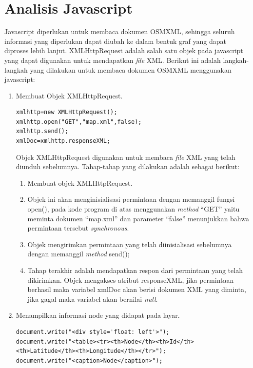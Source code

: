 \section{Analisis Javascript} \label{ssec:analisis_js}
Javascript diperlukan untuk membaca dokumen OSMXML, sehingga seluruh informasi
yang diperlukan dapat diubah ke dalam bentuk graf yang dapat diproses lebih
lanjut. XMLHttpRequest adalah salah satu objek pada javascript yang dapat
digunakan untuk mendapatkan \textit{file} XML. Berikut ini adalah langkah-langkah yang
dilakukan untuk membaca dokumen OSMXML menggunakan javascript:
\begin{enumerate}
  \item Membuat Objek XMLHttpRequest. 
\begin{verbatim}
xmlhttp=new XMLHttpRequest();
xmlhttp.open("GET","map.xml",false);
xmlhttp.send();
xmlDoc=xmlhttp.responseXML;
\end{verbatim}
Objek XMLHttpRequest digunakan untuk membaca \textit{file} XML yang telah
diunduh sebelumnya. Tahap-tahap yang dilakukan adalah sebagai berikut:
\begin{enumerate}
  \item Membuat objek XMLHttpRequest.
  
  \item Objek ini akan menginisialisasi permintaan dengan memanggil fungsi
  open(), pada kode program di atas menggunakan \textit{method} ``GET'' yaitu meminta dokumen ``map.xml'' 
  dan parameter ``false'' menunjukkan bahwa permintaan tersebut \textit{synchronous}.
  
  \item Objek mengirimkan permintaan yang telah diinisialisasi sebelumnya dengan
  memanggil \textit{method} send();
  
  \item Tahap terakhir adalah mendapatkan respon dari permintaan yang telah
  dikirimkan. Objek mengakses atribut responseXML, jika permintaan berhasil
  maka variabel xmlDoc akan berisi dokumen XML yang diminta, jika gagal maka
  variabel akan bernilai \textit{null}.
\end{enumerate}

  \item Menampilkan informasi node yang didapat pada layar.
\begin{verbatim}
document.write("<div style='float: left'>");
document.write("<table><tr><th>Node</th><th>Id</th>
<th>Latitude</th><th>Longitude</th></tr>");
document.write("<caption>Node</caption>");


\end{verbatim}
\end{enumerate}
